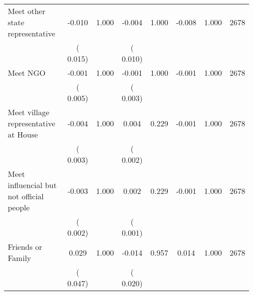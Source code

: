 \begin{tabular}{l*{7}{c}}
 Meet other state representative       &             -0.010       &        1.000  &             -0.004       &        1.000  &             -0.008       &              1.000 &  2678 \\ 
                       &       (       0.015)             &                               &       (       0.010)                     &                               &                                               &                                &                      \\ 

 Meet NGO       &             -0.001       &        1.000  &             -0.001       &        1.000  &             -0.001       &              1.000 &  2678 \\ 
                       &       (       0.005)             &                               &       (       0.003)                     &                               &                                               &                                &                      \\ 

 Meet village representative at House       &             -0.004       &        1.000  &              0.004       &        0.229  &             -0.001       &              1.000 &  2678 \\ 
                       &       (       0.003)             &                               &       (       0.002)                     &                               &                                               &                                &                      \\ 

 Meet influencial but not official people       &             -0.003       &        1.000  &              0.002       &        0.229  &             -0.001       &              1.000 &  2678 \\ 
                       &       (       0.002)             &                               &       (       0.001)                     &                               &                                               &                                &                      \\ 

 Friends or Family       &              0.029       &        1.000  &             -0.014       &        0.957  &              0.014       &              1.000 &  2678 \\ 
                       &       (       0.047)             &                               &       (       0.020)                     &                               &                                               &                                &                      \\ 

\hline \end{tabular}